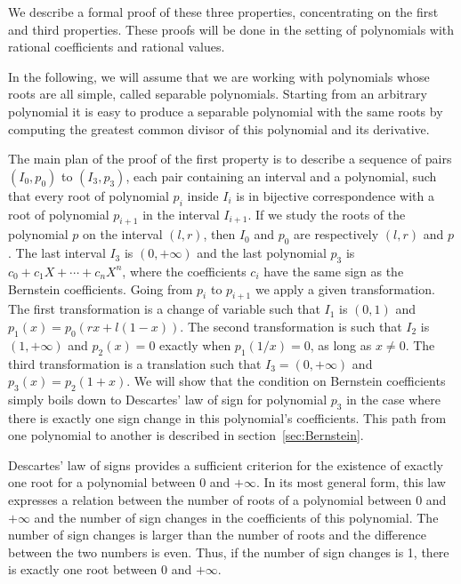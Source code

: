 \documentclass{mscs}
\begin{document}
We describe a formal proof of these three properties,
concentrating on the first and third properties. These proofs will be
done in the setting of polynomials with rational coefficients and
rational values.

In the following, we will assume that we are working with polynomials
whose roots are all simple, called separable polynomials.
Starting from an arbitrary polynomial it is easy to produce a
separable polynomial with the same roots by computing the greatest
common divisor of this polynomial and its derivative.


The main plan of the proof of the first property is to describe a
sequence of pairs \((I_0, p_0)\) to \((I_3, p_3)\), each pair
containing an interval and a polynomial, such that every root of
polynomial \(p_i\) inside \(I_i\) is in bijective correspondence with
a root of polynomial \(p_{i+1}\) in the interval \(I_{i+1}\).  If we
study the roots of the polynomial $p$ on the interval $(l, r)$,
then $I_0$ and $p_0$ are respectively $(l, r)$ and $p$.
The last interval $I_3$ is \((0, +\infty)\) and the last polynomial
$p_3$ is \(c_0 + c_1 X + \cdots + c_n X^n\), where the coefficients
\(c_i\) have the
same sign as the Bernstein coefficients.  Going from \(p_i\) to
\(p_{i+1}\) we apply a given transformation.  The first transformation
is a change of variable such that \(I_1\) is \((0,1)\) and \(p_1(x) =
p_0(r x + l (1 - x))\).  The second transformation is such that
\(I_2\) is \((1,+\infty)\) and \(p_2(x) = 0\) exactly when \(p_1(1/x)
= 0\), as long as \(x\neq 0\).  The third transformation is a
translation such that \(I_3 = (0,+\infty)\) and \(p_3(x) = p_2(1+x)\).
We will show that the condition on Bernstein coefficients simply
boils down to Descartes' law of sign \cite{descartes, bpr} for
polynomial \(p_3\) in the
case where there is exactly one sign change in this polynomial's coefficients.
This path from one polynomial to another is described in section~\ref{sec:Bernstein}.

Descartes' law of signs provides a sufficient criterion for the
existence of exactly one root for a polynomial
between 0 and \(+\infty\).  In its
most general form, this law
expresses a relation between the number of roots of a polynomial
between 0 and \(+\infty\) and the number of sign changes in the
coefficients of this polynomial.  The number of sign changes is larger
than the number of roots and the difference between the two numbers is
even.  Thus, if the number of sign changes is 1, there is
exactly one root between 0 and \(+\infty\).
\end{document}
